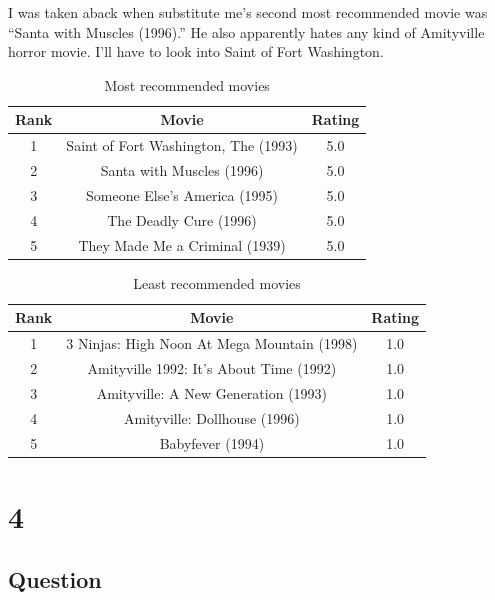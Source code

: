 \documentclass[letterpaper,11pt]{article}
\begin{document}
I was taken aback when substitute me's second most recommended movie was ``Santa with Muscles (1996).'' He also apparently hates any kind of Amityville horror movie. I'll have to look into Saint of Fort Washington.

\begin{table}[htb]
\centering
\begin{tabular}{ | c | c | c |}
\hline
\textbf{Rank} & \textbf{Movie} & \textbf{Rating} \\
\hline
1 & Saint of Fort Washington, The (1993) & 5.0 \\
\hline
2 & Santa with Muscles (1996) & 5.0 \\
\hline
3 & Someone Else's America (1995) & 5.0 \\ 
\hline
4 & The Deadly Cure (1996) & 5.0 \\
\hline
5 & They Made Me a Criminal (1939) & 5.0 \\
\hline
\end{tabular}
\caption{Most recommended movies}
\label{table:q3most}
\end{table}

\begin{table}[htb]
\centering
\begin{tabular}{ | c | c | c |}
\hline
\textbf{Rank} & \textbf{Movie} & \textbf{Rating} \\
\hline
1 & 3 Ninjas: High Noon At Mega Mountain (1998) & 1.0 \\
\hline
2 & Amityville 1992: It's About Time (1992) & 1.0 \\
\hline
3 & Amityville: A New Generation (1993) & 1.0 \\ 
\hline
4 & Amityville: Dollhouse (1996) & 1.0 \\
\hline
5 & Babyfever (1994) & 1.0 \\
\hline
\end{tabular}
\caption{Least recommended movies}
\label{table:q3least}
\end{table}


\clearpage


\section*{4}

\subsection*{Question}
\end{document}
